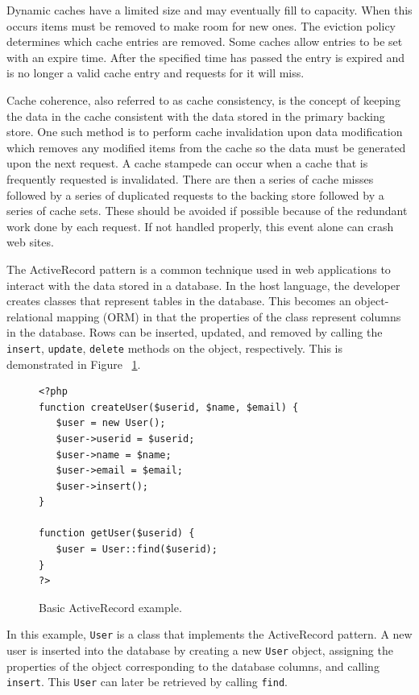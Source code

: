 \documentclass[12pt]{ucthesis}
\begin{document}
Dynamic caches have a limited size and may eventually fill to capacity.
When this occurs items must be removed to make room for new ones.
The eviction policy determines which cache entries are removed.
Some caches allow entries to be set with an expire time.
After the specified time has passed the entry is expired and is no longer a valid cache entry and requests for it will miss.

Cache coherence, also referred to as cache consistency, is the concept of keeping the data in the cache consistent with the data stored in the primary backing store.
One such method is to perform cache invalidation upon data modification which removes any modified items from the cache so the data must be generated upon the next request.
A cache stampede can occur when a cache that is frequently requested is invalidated.
There are then a series of cache misses followed by a series of duplicated requests to the backing store followed by a series of cache sets.
These should be avoided if possible because of the redundant work done by each request.
If not handled properly, this event alone can crash web sites.

The ActiveRecord pattern is a common technique used in web applications to interact with the data stored in a database.
In the host language, the developer creates classes that represent tables in the database.
This becomes an object-relational mapping (ORM) in that the properties of the class represent columns in the database.
Rows can be inserted, updated, and removed by calling the {\tt insert}, {\tt update}, {\tt delete} methods on the object, respectively.
This is demonstrated in Figure ~\ref{fig:activeRecordExample}.

\begin{figure}[h]
\begin{ssp}
\begin{verbatim}
<?php
function createUser($userid, $name, $email) {
   $user = new User();
   $user->userid = $userid;
   $user->name = $name;
   $user->email = $email;
   $user->insert();
}

function getUser($userid) {
   $user = User::find($userid);
}
?>
\end{verbatim}
\end{ssp}
\caption{Basic ActiveRecord example.}
\label{fig:activeRecordExample}
\end{figure}

In this example, {\tt User} is a class that implements the ActiveRecord pattern.
A new user is inserted into the database by creating a new {\tt User} object, assigning the properties of the object corresponding to the database columns, and calling {\tt insert}.
This {\tt User} can later be retrieved by calling {\tt find}.
\end{document}
